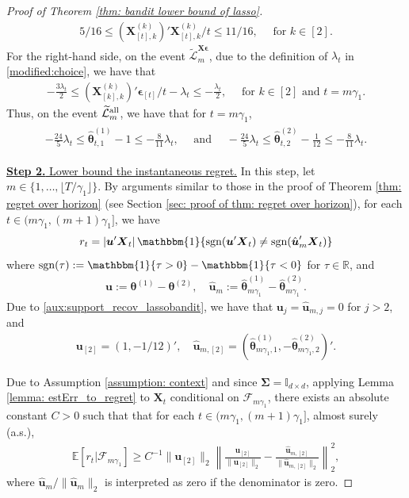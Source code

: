 \documentclass[aos,preprint]{imsart}
\theoremstyle{plain}
\theoremstyle{definition}
\newcommand{\btheta}{\boldsymbol{\theta}}
\newcommand{\bd}[1]{\boldsymbol{#1}}
\newcommand{\hbtheta}{\widehat{\boldsymbol{\theta}}}
\newcommand{\idf}{\mathbbm{1}}
\newcommand{\bX}{\boldsymbol{X}}
\newcommand{\bSigma}{\boldsymbol{\Sigma}}
\newcommand{\bu}{\boldsymbol{u}}
\newcommand{\bepsilon}{\bd{\epsilon}}
\newcommand{\bR}{\mathbb{R}}
\newcommand{\cF}{\mathcal{F}}
\newcommand{\Exp}{\mathbb{E}}
\newcommand{\tL}{\widetilde{\mathcal{L}}}
\begin{document}
\begin{appendix}
\begin{proof}[Proof of Theorem \ref{thm: bandit lower bound of lasso}]
\begin{align*}
    5/16 \leq (\bX_{[t],k}^{(k)})'\bX_{[t],k}^{(k)}/t \leq  11/16,\quad \text{ for } k \in [2].
\end{align*}
For the right-hand side, on the event $\tL_m^{\bX\bepsilon}$, due to the definition of $\lambda_{t}$ in \eqref{modified:choice}, we have that  
\begin{align*}
    -\frac{3\lambda_t}{2}  \leq {(\bX_{[k],k}^{(k)})'\bepsilon_{[t]}}/{t} - \lambda_t  
\leq  -\frac{\lambda_t}{2},\quad \text{ for } k \in [2] \text{ and } t = m\gamma_1.
\end{align*}
Thus, on the event $\tL_m^{\textup{all}}$, we have that for $t = m\gamma_1$, 
\begin{align}\label{aux:lassobandit_est_error}
\begin{split}
    -\frac{24}{5} \lambda_t \leq \hbtheta_{t,1}^{(1)} - 1 \leq -\frac{8}{11} \lambda_t, \quad \text{ and } \quad       -\frac{24}{5} \lambda_t \leq \hbtheta_{t,2}^{(2)} - \frac{1}{12} \leq -\frac{8}{11} \lambda_t.
    \end{split}
\end{align}
 


\medskip
\noindent \underline{\textbf{Step 2.} Lower bound the instantaneous regret.} In this step, let $m \in \{1,\ldots, \lfloor T/\gamma_1\rfloor\}$. By arguments similar to those in the proof of Theorem \ref{thm: regret over horizon} (see Section \ref{sec: proof of thm: regret over horizon}), for  each $t \in (m\gamma_1, (m+1)\gamma_1]$, we have
\begin{align*}
    r_t = \left|\bu'\bX_t\right| \idf\{
    \textup{sgn}(\bu'\bX_t) \neq   \textup{sgn}(\hat{\bu}_m'\bX_t) 
    \}
\end{align*}
where  $\textup{sgn}(\tau) := \idf\{\tau > 0\} - \idf\{\tau < 0\}$ for $\tau \in \bR$, and
\begin{align*}
    \bu := \btheta^{(1)} - \btheta^{(2)}, \quad 
    \hat{\bu}_m := \hbtheta_{m\gamma_1}^{(1)} - \hbtheta_{m\gamma_1}^{(2)}.
\end{align*}
Due to \eqref{aux:support_recov_lassobandit}, we have that $\bu_j =  \hat{\bu}_{m,j} = 0$ for $j > 2$, and
\begin{align*}
\bu_{[2]} = (1,-1/12)', \quad
\hat{\bu}_{m,[2]} =  (\hbtheta_{m\gamma_1,1}^{(1)}, -\hbtheta_{m\gamma_1,2}^{(2)})'.
\end{align*}


Due to Assumption \ref{assumption: context} and since $\bSigma = \mathbb{I}_{d \times d}$, applying Lemma \ref{lemma: estErr_to_regret} to $\bX_{t}$ conditional on $\cF_{m\gamma_1}$, there exists an absolute constant $C >0$ such that that for each $t \in (m\gamma_1, (m+1)\gamma_1]$, almost surely (a.s.),
\begin{align*}
   \Exp\left[r_t \vert \cF_{m\gamma_1}\right]  
   \geq C^{-1} \|\bu_{[2]}\|_2 \left\|\frac{\bu_{[2]}}{\|\bu_{[2]}\|_2} - \frac{\hat{\bu}_{m,[2]}}{\|\hat{\bu}_{m,[2]}\|_2} \right\|_2^2,
\end{align*}
where $\hat{\bu}_m/{\|\hat{\bu}_m\|_2}$ is interpreted as zero if the denominator is zero.


\end{proof}
\end{appendix}
\end{document}
